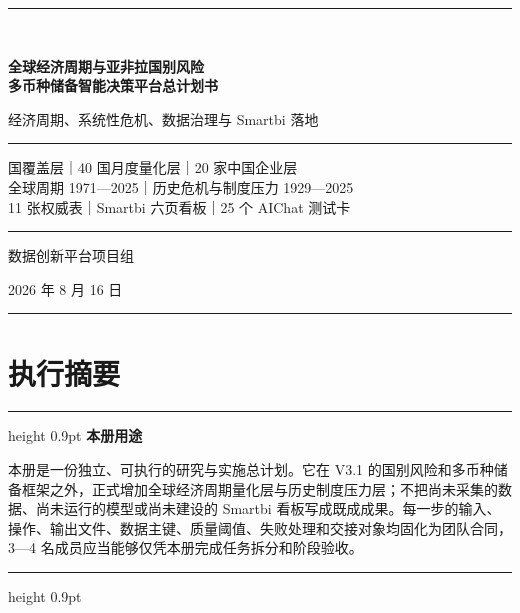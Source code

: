 \documentclass[UTF8,fontset=windows,12pt,openany]{ctexbook}
\newenvironment{decisionbox}[1][]{%
  \par\medskip\noindent\begin{center}\begin{minipage}{0.93\textwidth}%
  \color{OceanBlue}\hrule height 0.9pt\vspace{0.45em}%
  \textbf{#1}\par\smallskip\color{black}%
}{%
  \par\vspace{0.35em}\color{OceanBlue}\hrule height 0.9pt%
  \end{minipage}\end{center}\medskip%
}
\begin{document}
\begin{titlepage}
  \pagecolor{PaleBlue}
  \centering
  \vspace*{1.6cm}
  {\color{OceanBlue}\rule{0.88\textwidth}{1.5pt}}\\[1.05cm]
  {\Huge\bfseries\color{DeepNavy}全球经济周期与亚非拉国别风险\\[0.35cm]多币种储备智能决策平台总计划书\par}
  \vspace{0.7cm}
  {\LARGE\color{OceanBlue}经济周期、系统性危机、数据治理与 Smartbi 落地\par}
  \vspace{1.0cm}
  \begin{minipage}{0.86\textwidth}
    \color{GoldLine}\rule{\textwidth}{0.9pt}\par\vspace{0.45cm}
    \color{black} 国覆盖层｜40 国月度量化层｜20 家中国企业层\\[0.25cm]
    全球周期 1971—2025｜历史危机与制度压力 1929—2025\\[0.25cm]
    11 张权威表｜Smartbi 六页看板｜25 个 AIChat 测试卡
    \vspace{0.45cm}\par\color{GoldLine}\rule{\textwidth}{0.9pt}
  \end{minipage}
  \vfill
  {\large 数据创新平台项目组\par}
  \vspace{0.25cm}
  {\large 2026 年 8 月 16 日\par}
  \vspace{0.75cm}
  {\color{OceanBlue}\rule{0.88\textwidth}{1.5pt}}
  \nopagecolor
\end{titlepage}

\frontmatter

\chapter*{执行摘要}

\begin{decisionbox}[本册用途]
本册是一份独立、可执行的研究与实施总计划。它在 V3.1 的国别风险和多币种储备框架之外，正式增加全球经济周期量化层与历史制度压力层；不把尚未采集的数据、尚未运行的模型或尚未建设的 Smartbi 看板写成既成成果。每一步的输入、操作、输出文件、数据主键、质量阈值、失败处理和交接对象均固化为团队合同，3—4 名成员应当能够仅凭本册完成任务拆分和阶段验收。
\end{decisionbox}
\end{document}
